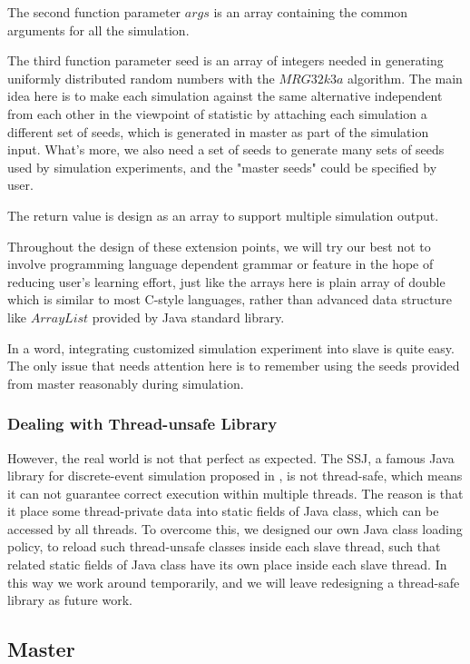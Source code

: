 The second function parameter $args$ is an array containing the common arguments for all the simulation.

The third function parameter seed is an array of integers needed in generating uniformly distributed random numbers with the $MRG32k3a$ algorithm. The main idea here is to make each simulation against the same alternative independent from each other in the viewpoint of statistic by attaching each simulation a different set of seeds, which is generated in master as part of the simulation input. What's more, we also need a set of seeds to generate many sets of seeds used by simulation experiments, and the "master seeds" could be specified by user.

The return value is design as an array to support multiple simulation output.

Throughout the design of these extension points, we will try our best not to involve programming language dependent grammar or feature in the hope of reducing user's learning effort, just like the arrays here is plain array of double which is similar to most C-style languages, rather than advanced data structure like $ArrayList$ provided by Java standard library.

In a word, integrating customized simulation experiment into slave is quite easy. The only issue that needs attention here is to remember using the seeds provided from master reasonably during simulation.

\subsubsection{Dealing with Thread-unsafe Library}

However, the real world is not that perfect as expected. The SSJ, a famous Java library for discrete-event simulation proposed in \cite{ssj}, is not thread-safe, which means it can not guarantee correct execution within multiple threads. The reason is that it place some thread-private data into static fields of Java class, which can be accessed by all threads. To overcome this, we designed our own Java class loading policy, to reload such thread-unsafe classes inside each slave thread, such that related static fields of Java class have its own place inside each slave thread. In this way we work around temporarily, and we will leave redesigning a thread-safe library as future work.

\subsection{Master}

